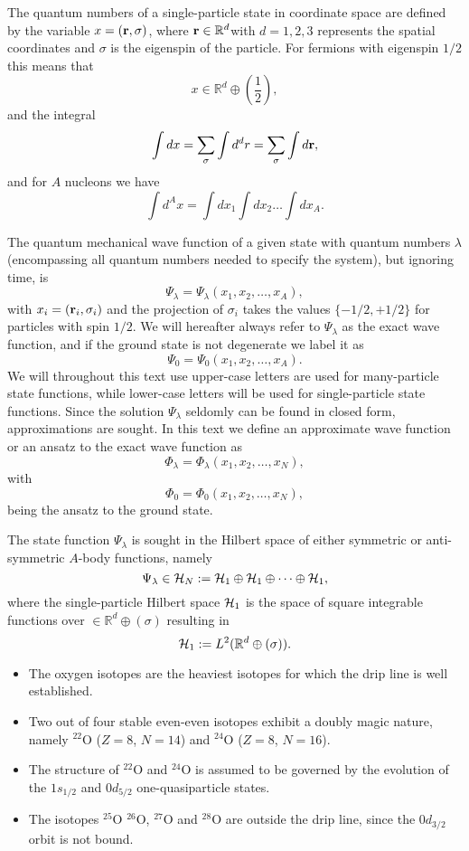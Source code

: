 \begin{itemize}
The quantum numbers of a single-particle state in coordinate space are
defined by the variable $x=({\bf r},\sigma)$, where ${\bf r}\in {\mathbb{R}}^{d}$with $d=1,2,3$ represents 
the spatial coordinates and $\sigma$ is the eigenspin of the particle. For fermions with eigenspin $1/2$ this means that
\[
 x\in {\mathbb{R}}^{d}\oplus (\frac{1}{2}),
\]
and the integral
\[
\int dx = \sum_{\sigma}\int d^dr = \sum_{\sigma}\int d{\bf r},
\]
and for $A$ nucleons we have
\[
\int d^Ax= \int dx_1\int dx_2\dots\int dx_A.
\]

The quantum mechanical wave function of a 
given state with quantum numbers $\lambda$ (encompassing all quantum numbers needed to specify the system), but ignoring time, is
\[
\Psi_{\lambda}=\Psi_{\lambda}(x_1,x_2,\dots,x_A),
\]
with $x_i=({\bf r}_i,\sigma_i)$ and the projection of $\sigma_i$ takes the values
$\{-1/2,+1/2\}$ for particles with spin $1/2$. 
We will hereafter always refer to $\Psi_{\lambda}$ as the exact wave function, and if the ground state is not degenerate we label it as 
\[
\Psi_0=\Psi_0(x_1,x_2,\dots,x_A).
\]
We will throughout this text use 
upper-case letters are used for many-particle state functions, while lower-case letters will be used for single-particle
state functions.
Since the solution $\Psi_{\lambda}$ seldomly can be found in closed
form, approximations are sought. In this text we define an
approximate wave function or an ansatz to the exact wave function as
\[
\Phi_{\lambda}=\Phi_{\lambda}(x_1,x_2,\dots,x_N),
\]
with 
\[
\Phi_0=\Phi_0(x_1,x_2,\dots,x_N),
\]
being the ansatz to the ground state.  

The state function $\Psi_{\lambda}$ is sought in the Hilbert space of either symmetric or anti-symmetric $A$-body functions, namely
\[
\Psi_{\lambda}\in {\cal H}_N:= {\cal H}_1\oplus{\cal H}_1\oplus\dots\oplus{\cal H}_1,
\]
where the single-particle Hilbert space ${\cal H}_1$ is the space of square integrable functions over
$\in {\mathbb{R}}^{d}\oplus (\sigma)$
resulting in
\[
{\cal H}_1:= L^2(\mathbb{R}^{d}\oplus (\sigma)).
\]

\begin{itemize}
\item The oxygen isotopes are the heaviest isotopes for
which the drip line is well established.
\item Two out of four
stable even-even isotopes exhibit a doubly magic nature,
namely $^{22}$O ($Z=8$, $N=14$) and $^{24}$O ($Z=8$, $N=16$).
\item 
The structure of $^{22}$O and $^{24}$O is assumed to be governed
by the evolution of the $1s_{1/2}$ and $0d_{5/2}$  one-quasiparticle states.
\item The isotopes
$^{25}$O
$^{26}$O, $^{27}$O and $^{28}$O are outside the drip line, since the $0d_{3/2}$ orbit is not bound.
\end{itemize}


\end{itemize}
